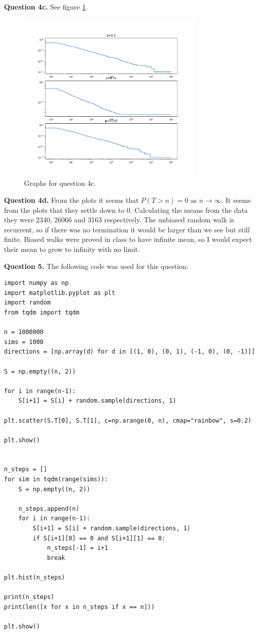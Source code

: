 \documentclass[letterpaper, reqno,11pt]{article}
\begin{document}
{\medskip\noindent\bf Question 4c.} See figure \ref{fig:4c}.

\begin{figure}[htpb]
    \centering
    \includegraphics[width=0.8\textwidth]{4c}
    \caption{Graphs for question 4c.}
    \label{fig:4c}
\end{figure}

{\medskip\noindent\bf Question 4d.} From the plots it seems that $P(T>n)=0$ as $n\to \infty$. It seems from the plots that they settle down to 0. Calculating the means from the data they were 2340, 26066 and 3163 respectively. The unbiased random walk is recurrent, so if there was no termination it would be larger than we see but still finite. Biased walks were proved in class to have infinite mean, so I would expect their mean to grow to infinity with no limit. 

{\medskip\noindent\bf Question 5.} The following code was used for this question: 
\begin{lstlisting}
import numpy as np
import matplotlib.pyplot as plt
import random
from tqdm import tqdm

n = 1000000
sims = 1000
directions = [np.array(d) for d in [(1, 0), (0, 1), (-1, 0), (0, -1)]]

S = np.empty((n, 2))

for i in range(n-1):
    S[i+1] = S[i] + random.sample(directions, 1)

plt.scatter(S.T[0], S.T[1], c=np.arange(0, n), cmap="rainbow", s=0.2)

plt.show()


n_steps = []
for sim in tqdm(range(sims)):
    S = np.empty((n, 2))

    n_steps.append(n)
    for i in range(n-1):
        S[i+1] = S[i] + random.sample(directions, 1)
        if S[i+1][0] == 0 and S[i+1][1] == 0:
            n_steps[-1] = i+1
            break

plt.hist(n_steps)

print(n_steps)
print(len([x for x in n_steps if x == n]))

plt.show()
\end{lstlisting}
\end{document}
